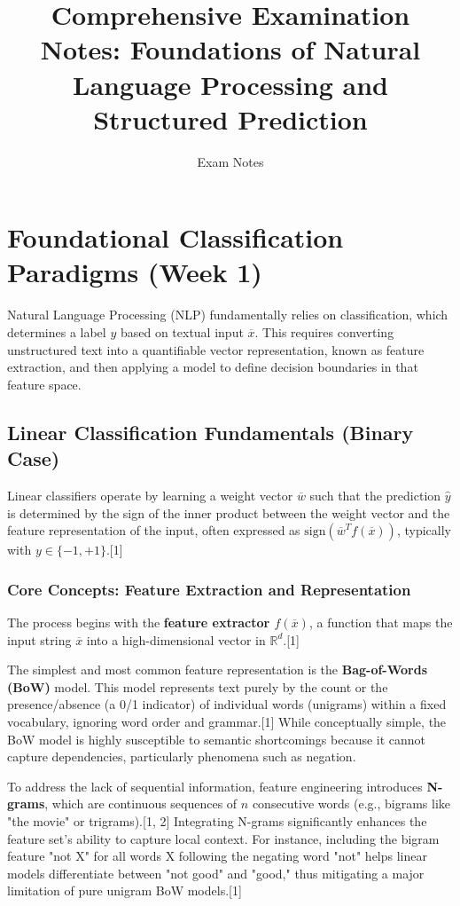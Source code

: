 \documentclass{article}
\title{Comprehensive Examination Notes: Foundations of Natural Language Processing and Structured Prediction}
\author{Exam Notes}
\date{}
\begin{document}
\maketitle

\tableofcontents

\clearpage

\section{Foundational Classification Paradigms (Week 1)}

Natural Language Processing (NLP) fundamentally relies on classification, which determines a label $y$ based on textual input $\overline{x}$. This requires converting unstructured text into a quantifiable vector representation, known as feature extraction, and then applying a model to define decision boundaries in that feature space.

\subsection{Linear Classification Fundamentals (Binary Case)}

Linear classifiers operate by learning a weight vector $\overline{w}$ such that the prediction $\hat{y}$ is determined by the sign of the inner product between the weight vector and the feature representation of the input, often expressed as $\text{sign}(\overline{w}^{T}f(\overline{x}))$, typically with $y \in \{-1, +1\}$.[1]

\subsubsection{Core Concepts: Feature Extraction and Representation}

The process begins with the \textbf{feature extractor $f(\overline{x})$}, a function that maps the input string $\overline{x}$ into a high-dimensional vector in $\mathbb{R}^d$.[1]

The simplest and most common feature representation is the \textbf{Bag-of-Words (BoW)} model. This model represents text purely by the count or the presence/absence (a 0/1 indicator) of individual words (unigrams) within a fixed vocabulary, ignoring word order and grammar.[1] While conceptually simple, the BoW model is highly susceptible to semantic shortcomings because it cannot capture dependencies, particularly phenomena such as negation.

To address the lack of sequential information, feature engineering introduces \textbf{N-grams}, which are continuous sequences of $n$ consecutive words (e.g., bigrams like "the movie" or trigrams).[1, 2] Integrating N-grams significantly enhances the feature set's ability to capture local context. For instance, including the bigram feature "not X" for all words X following the negating word "not" helps linear models differentiate between "not good" and "good," thus mitigating a major limitation of pure unigram BoW models.[1]
\end{document}
